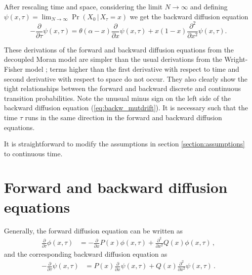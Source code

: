\documentclass[preprint]{elsarticle}
\newcommand\given{{\,|\,}}
\newcommand\x[1]{\ensuremath{X_{#1}}}
\newcommand\y{\ensuremath{Y}}
\begin{document}
After rescaling time and space, considering the limit $N \to \infty$ and defining $\psi(x,\tau)=\lim_{N\to\infty}\Pr(\x{0}\given\x{\tau}=x)$ we get the backward diffusion equation
\begin{equation}\label{eq:backw_mutdrift}
-\frac{\partial}{\partial \tau} \psi(x,\tau) =
    \theta(\alpha-x)\frac{\partial}{\partial x} \psi(x,\tau) +x(1-x)\frac{\partial^2}{\partial x^2}\psi(x,\tau).
\end{equation}

These derivations of the forward and backward diffusion equations from the decoupled Moran model are simpler than the usual derivations from the Wright-Fisher model \citep{Ewen04}; terms higher than the first derivative with respect to time and second derivative with respect to space do not occur. They also clearly show the tight relationships between the forward and backward discrete and continuous transition probabilities. Note the unusual minus sign on the left side of the backward diffusion equation (\ref{eq:backw_mutdrift}). It is necessary such that the time $\tau$ runs in the same direction in the forward and backward diffusion equations.



It is straightforward to modify the assumptions in section \ref{section:assumptions} to continuous time.

\section{Forward and backward diffusion equations}

Generally, the forward diffusion equation can be written as
\begin{equation}\label{eq:forw_general}
\begin{split}
\frac{\partial}{\partial \tau}\phi(x,\tau)&=-\frac{\partial}{\partial x} P(x)\phi(x,\tau)+\frac{\partial^2}{\partial x^2} Q(x) \phi(x,\tau)\,,
\end{split}
\end{equation}
and the corresponding backward diffusion equation as
\begin{equation}\label{eq:backw_general}
\begin{split}
-\frac{\partial}{\partial \tau}\psi(x,\tau)&=P(x)\frac{\partial}{\partial x} \psi(x,\tau)+Q(x)\frac{\partial^2}{\partial x^2} \psi(x,\tau)\,.
\end{split}
\end{equation}
\end{document}

